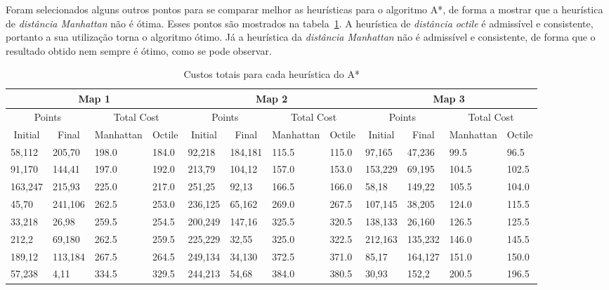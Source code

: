 Foram selecionados alguns outros pontos para se comparar melhor as heurísticas para o algoritmo A*, de forma a mostrar que a heurística de \textit{distância Manhattan} não é ótima. Esses pontos são mostrados na tabela~\ref{tab:a-total-costs}. A heurística de \textit{distância octile} é admissível e consistente, portanto a sua utilização torna o algoritmo ótimo. Já a heurística da \textit{distância Manhattan} não é admissível e consistente, de forma que o resultado obtido nem sempre é ótimo, como se pode observar.

\begin{table}[htbp]
\caption{Custos totais para cada heurística do A*}
\label{tab:a-total-costs}
\begin{adjustbox}{max width=\textwidth}
\begin{tabular}{llll|llll|llll}
\multicolumn{4}{c}{Map 1} & \multicolumn{4}{c}{Map 2} & \multicolumn{4}{c}{Map 3} \\ \hline
\multicolumn{2}{c}{Points} & \multicolumn{2}{c}{Total Cost} & \multicolumn{2}{c}{Points} & \multicolumn{2}{c}{Total Cost} & \multicolumn{2}{c}{Points} & \multicolumn{2}{c}{Total Cost} \\ \hline
\multicolumn{1}{c}{Initial} & \multicolumn{1}{c}{Final} & \multicolumn{1}{c}{Manhattan} & \multicolumn{1}{c|}{Octile} & \multicolumn{1}{c}{Initial} & \multicolumn{1}{c}{Final} & \multicolumn{1}{c}{Manhattan} & \multicolumn{1}{c|}{Octile} & \multicolumn{1}{c}{Initial} & \multicolumn{1}{c}{Final} & \multicolumn{1}{c}{Manhattan} & \multicolumn{1}{c}{Octile} \\ \hline
58,112 & 205,70 & 198.0 & 184.0 & 92,218 & 184,181 & 115.5 & 115.0 & 97,165 & 47,236 & 99.5 & 96.5 \\
91,170 & 144,41 & 197.0 & 192.0 & 213,79 & 104,12 & 157.0 & 153.0 & 153,229 & 69,195 & 104.5 & 102.5 \\
163,247 & 215,93 & 225.0 & 217.0 & 251,25 & 92,13 & 166.5 & 166.0 & 58,18 & 149,22 & 105.5 & 104.0 \\
45,70 & 241,106 & 262.5 & 253.0 & 236,125 & 65,162 & 269.0 & 267.5 & 107,145 & 38,205 & 124.0 & 115.5 \\
33,218 & 26,98 & 259.5 & 254.5 & 200,249 & 147,16 & 325.5 & 320.5 & 138,133 & 26,160 & 126.5 & 125.5 \\
212,2 & 69,180 & 262.5 & 259.5 & 225,229 & 32,55 & 325.0 & 322.5 & 212,163 & 135,232 & 146.0 & 145.5 \\
189,12 & 113,184 & 267.5 & 264.5 & 249,134 & 34,130 & 372.5 & 371.0 & 85,17 & 164,127 & 151.0 & 150.0 \\
57,238 & 4,11 & 334.5 & 329.5 & 244,213 & 54,68 & 384.0 & 380.5 & 30,93 & 152,2 & 200.5 & 196.5 
\end{tabular}
\end{adjustbox}
\end{table}


